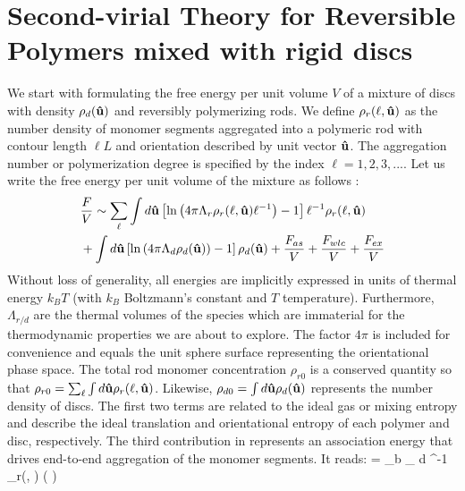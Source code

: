  
\section[Second-virial Theory]{Second-virial Theory for Reversible Polymers mixed with rigid discs}


We start with formulating the free energy per unit volume $V$ of a mixture of discs with density $\rho_{d}({\bf \hat{u}}) $ and reversibly polymerizing rods. We define $\rho_{r}(\ell, {\bf \hat{u}})$ as the number density of monomer segments  aggregated into a polymeric rod with contour length $\ell L$  and orientation described by unit vector ${\bf \hat{u}}$.  The aggregation number or polymerization degree is specified by the index $\ell =1,2,3,...$.  Let us write the free energy per unit volume of the mixture as follows \cite{kuriabova2010,wensink_mm2019}:
 \begin{align}
& \frac{  F}{ V}  \sim  \sum_{\ell} \int  d {\bf \hat{u}}   \left [ \ln \left (4 \pi \Lambda_{r} \rho_{r} (\ell, {\bf \hat{u}}) \ell^{-1}  \right ) - 1 \right ] \ell^{-1} \rho_{r} (\ell, {\bf \hat{u}}) \nonumber \\ 
& +     \int  d {\bf \hat{u}}   \left [ \ln \left ( 4 \pi \Lambda_{d} \rho_{d} ( {\bf \hat{u}})   \right ) - 1 \right ]  \rho_{d} ({\bf \hat{u}})  + \frac{F_{as}}{V} +  \frac{F_{wlc}}{V} + \frac{F_{ex}}{V} \nonumber \\ 
 \label{free}
\end{align}
Without loss of generality,  all energies are implicitly expressed in units of thermal energy $k_{B}T$ (with $k_{B}$ Boltzmann's constant and $T$ temperature). Furthermore, $\Lambda_{r/d}$ are the thermal volumes of the species  which are immaterial for the thermodynamic properties we are about to explore. The factor $4 \pi$ is included for convenience and equals the unit sphere surface representing the orientational phase space. 
The total rod monomer concentration $\rho_{r0}$ is a conserved quantity so that $\rho_{r0} = \sum_{\ell} \int  d {\bf \hat{u}} \rho_{r}(\ell, {\bf \hat{u}} )$. Likewise, $\rho_{d0} = \int d {\bf \hat{u}} \rho_{d} ({\bf \hat{u}})$ represents the number  density of discs.
The first two terms are related to the ideal gas or mixing entropy and describe the ideal translation and orientational entropy of each polymer  and disc, respectively.
The third contribution in  represents an association energy that drives end-to-end aggregation of the  monomer segments. It reads: 
 \beq
{}  =  \varepsilon_{b}  \sum_{\ell} \int d \oma \ell^{-1} \rho_{r}(\ell, \oma) ( ) 
 \label{fas} 
 \eeq
